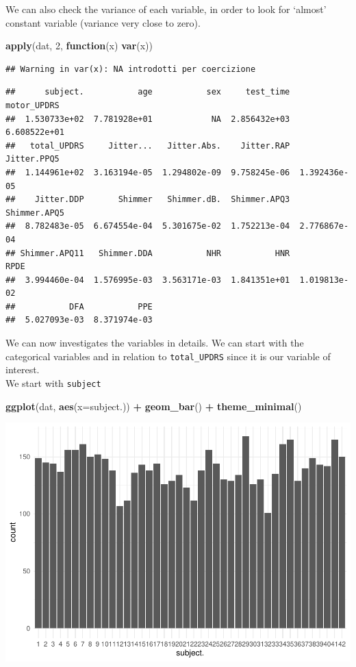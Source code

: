\documentclass[
]{article}
\newenvironment{Shaded}{\begin{snugshade}}{\end{snugshade}}
\newcommand{\AttributeTok}[1]{\textcolor[rgb]{0.13,0.29,0.53}{#1}}
\newcommand{\ControlFlowTok}[1]{\textcolor[rgb]{0.13,0.29,0.53}{\textbf{#1}}}
\newcommand{\DecValTok}[1]{\textcolor[rgb]{0.00,0.00,0.81}{#1}}
\newcommand{\FunctionTok}[1]{\textcolor[rgb]{0.13,0.29,0.53}{\textbf{#1}}}
\newcommand{\NormalTok}[1]{#1}
\newcommand{\SpecialCharTok}[1]{\textcolor[rgb]{0.81,0.36,0.00}{\textbf{#1}}}
\begin{document}
We can also check the variance of each variable, in order to look for
`almost' constant variable (variance very close to zero).

\begin{Shaded}
\begin{Highlighting}[]
\FunctionTok{apply}\NormalTok{(dat, }\DecValTok{2}\NormalTok{, }\ControlFlowTok{function}\NormalTok{(x) }\FunctionTok{var}\NormalTok{(x))}
\end{Highlighting}
\end{Shaded}

\begin{verbatim}
## Warning in var(x): NA introdotti per coercizione
\end{verbatim}

\begin{verbatim}
##      subject.           age           sex     test_time   motor_UPDRS 
##  1.530733e+02  7.781928e+01            NA  2.856432e+03  6.608522e+01 
##   total_UPDRS     Jitter...   Jitter.Abs.    Jitter.RAP   Jitter.PPQ5 
##  1.144961e+02  3.163194e-05  1.294802e-09  9.758245e-06  1.392436e-05 
##    Jitter.DDP       Shimmer   Shimmer.dB.  Shimmer.APQ3  Shimmer.APQ5 
##  8.782483e-05  6.674554e-04  5.301675e-02  1.752213e-04  2.776867e-04 
## Shimmer.APQ11   Shimmer.DDA           NHR           HNR          RPDE 
##  3.994460e-04  1.576995e-03  3.563171e-03  1.841351e+01  1.019813e-02 
##           DFA           PPE 
##  5.027093e-03  8.371974e-03
\end{verbatim}

We can now investigates the variables in details. We can start with the
categorical variables and in relation to \texttt{total\_UPDRS} since it
is our variable of interest.\\
We start with \texttt{subject}

\begin{Shaded}
\begin{Highlighting}[]
\FunctionTok{ggplot}\NormalTok{(dat, }\FunctionTok{aes}\NormalTok{(}\AttributeTok{x=}\NormalTok{subject.)) }\SpecialCharTok{+}
  \FunctionTok{geom\_bar}\NormalTok{() }\SpecialCharTok{+} 
  \FunctionTok{theme\_minimal}\NormalTok{()}
\end{Highlighting}
\end{Shaded}

\includegraphics{Data_Exploration_files/figure-latex/unnamed-chunk-8-1.pdf}
\end{document}

